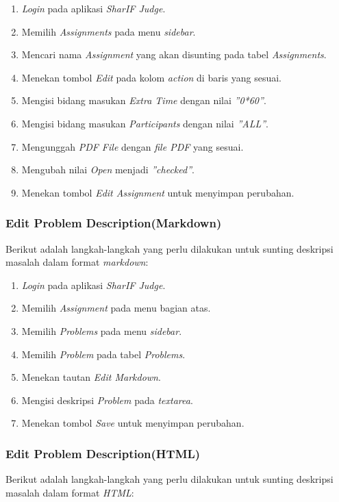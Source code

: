 \begin{enumerate}
	\item \textit{Login} pada aplikasi \textit{SharIF Judge}.
	\item Memilih \textit{Assignments} pada menu \textit{sidebar}.
	\item Mencari nama \textit{Assignment} yang akan disunting pada tabel \textit{Assignments}.
	\item Menekan tombol \textit{Edit} pada kolom \textit{action} di baris yang sesuai.
	\item Mengisi bidang masukan \textit{Extra Time} dengan nilai \textit{''0*60''}.
	\item Mengisi bidang masukan \textit{Participants} dengan nilai \textit{''ALL''}.
	\item Mengunggah \textit{PDF File} dengan \textit{file PDF} yang sesuai.
	\item Mengubah nilai \textit{Open} menjadi \textit{''checked''}.
	\item Menekan tombol \textit{Edit Assignment} untuk menyimpan perubahan.
\end{enumerate}

\subsubsection{Edit Problem Description(Markdown)}
\label{subsubsec:skenario_edit_problem_description_markdown}
Berikut adalah langkah-langkah yang perlu dilakukan untuk sunting deskripsi masalah dalam format \textit{markdown}:

\begin{enumerate}
	\item \textit{Login} pada aplikasi \textit{SharIF Judge}.
	\item Memilih \textit{Assignment} pada menu bagian atas.
	\item Memilih \textit{Problems} pada menu \textit{sidebar}.
	\item Memilih \textit{Problem} pada tabel \textit{Problems}.
	\item Menekan tautan \textit{Edit Markdown}.
	\item Mengisi deskripsi \textit{Problem} pada \textit{textarea}.
	\item Menekan tombol \textit{Save} untuk menyimpan perubahan.
\end{enumerate}

\subsubsection{Edit Problem Description(HTML)}
\label{subsubsec:skenario_edit_problem_description_html}
Berikut adalah langkah-langkah yang perlu dilakukan untuk sunting deskripsi masalah dalam format \textit{HTML}:

